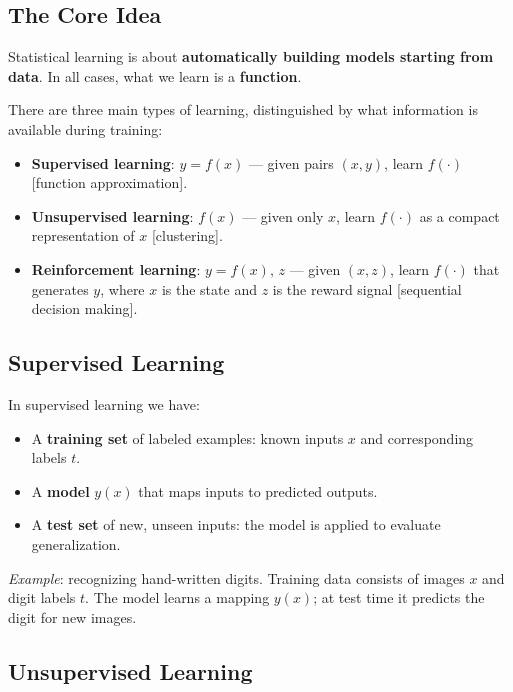 \documentclass[11pt,a4paper]{article}
\theoremstyle{definition}
\theoremstyle{plain}
\theoremstyle{remark}
\begin{document}
\subsection{The Core Idea}

\begin{tcolorbox}[colback=blue!5!white,colframe=blue!75!black,title=\textbf{Core idea}]
Statistical learning is about \textbf{automatically building models starting from data}. In all cases, what we learn is a \textbf{function}.
\end{tcolorbox}

There are three main types of learning, distinguished by what information is available during training:

\begin{itemize}
    \item \textbf{Supervised learning}: $y = f(x)$ — given pairs $(x, y)$, learn $f(\cdot)$ [function approximation].
    \item \textbf{Unsupervised learning}: $f(x)$ — given only $x$, learn $f(\cdot)$ as a compact representation of $x$ [clustering].
    \item \textbf{Reinforcement learning}: $y = f(x),\, z$ — given $(x, z)$, learn $f(\cdot)$ that generates $y$, where $x$ is the state and $z$ is the reward signal [sequential decision making].
\end{itemize}

\subsection{Supervised Learning}

In supervised learning we have:
\begin{itemize}
    \item A \textbf{training set} of labeled examples: known inputs $x$ and corresponding labels $t$.
    \item A \textbf{model} $y(x)$ that maps inputs to predicted outputs.
    \item A \textbf{test set} of new, unseen inputs: the model is applied to evaluate generalization.
\end{itemize}

\textit{Example}: recognizing hand-written digits. Training data consists of images $x$ and digit labels $t$. The model learns a mapping $y(x)$; at test time it predicts the digit for new images.

\subsection{Unsupervised Learning}
\end{document}
